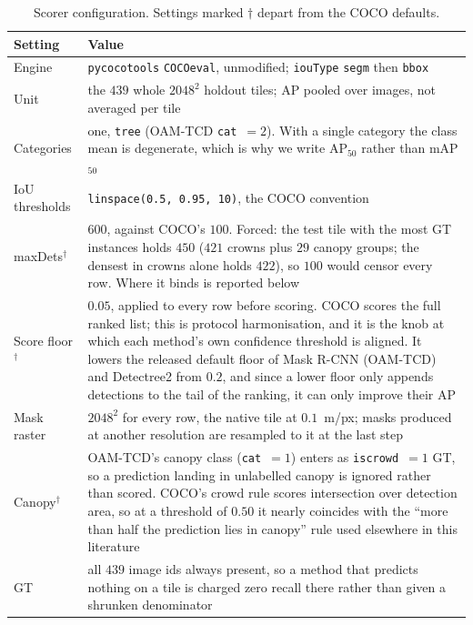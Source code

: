 \documentclass[remotesensing,article,submit,moreauthors]{Definitions/mdpi}
\begin{document}
\begin{table}[H]
\caption{Scorer configuration. Settings marked $\dagger$ depart from the COCO defaults.\label{tab:protocol}}
 
\renewcommand{\arraystretch}{1.25}
\begin{tabularx}{\textwidth}{KV}
\toprule
\textbf{Setting} & \textbf{Value} \\
\midrule
Engine & \texttt{pycocotools} \texttt{COCOeval}, unmodified; \texttt{iouType} \texttt{segm} then \texttt{bbox} \\
Unit & the $439$ whole $2048^2$ holdout tiles; AP pooled over images, not averaged per tile \\
Categories & one, \texttt{tree} (OAM-TCD \texttt{cat}~$=2$). With a single category the class mean is degenerate, which is why we write AP$_{50}$ rather than mAP$_{50}$ \\
IoU thresholds & \texttt{linspace(0.5, 0.95, 10)}, the COCO convention \\
maxDets$^{\dagger}$ & $600$, against COCO's $100$. Forced: the test tile with the most GT instances holds $450$ ($421$ crowns plus $29$ canopy groups; the densest in crowns alone holds $422$), so $100$ would censor every row. Where it binds is reported below \\
Score floor$^{\dagger}$ & $0.05$, applied to every row before scoring. COCO scores the full ranked list; this is protocol harmonisation, and it is the knob at which each method's own confidence threshold is aligned. It lowers the released default floor of Mask R-CNN (OAM-TCD) and Detectree2 from $0.2$, and since a lower floor only appends detections to the tail of the ranking, it can only improve their AP \\
Mask raster & $2048^2$ for every row, the native tile at $0.1$~m/px; masks produced at another resolution are resampled to it at the last step \\
Canopy$^{\dagger}$ & OAM-TCD's canopy class (\texttt{cat}~$=1$) enters as \texttt{iscrowd}~$=1$ GT, so a prediction landing in unlabelled canopy is ignored rather than scored. COCO's crowd rule scores intersection over detection area, so at a threshold of $0.50$ it nearly coincides with the ``more than half the prediction lies in canopy'' rule used elsewhere in this literature \\
GT & all $439$ image ids always present, so a method that predicts nothing on a tile is charged zero recall there rather than given a shrunken denominator \\
\bottomrule
\end{tabularx}
\end{table}
\end{document}
